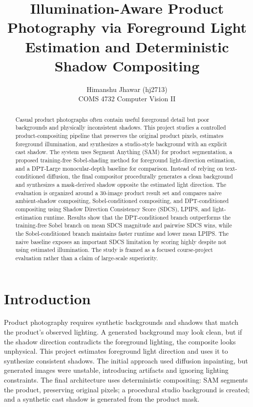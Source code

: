 \documentclass{article}
\title{Illumination-Aware Product Photography via Foreground Light Estimation and Deterministic Shadow Compositing}
\author{
Himanshu Jhawar (hj2713)\\
COMS 4732 Computer Vision II\\
}
\date{}
\begin{document}
\maketitle
\vspace{-1.5cm}  %

\begin{abstract}
Casual product photographs often contain useful foreground detail but poor backgrounds and physically inconsistent shadows. This project studies a controlled product-compositing pipeline that preserves the original product pixels, estimates foreground illumination, and synthesizes a studio-style background with an explicit cast shadow. The system uses Segment Anything (SAM) for product segmentation, a proposed training-free Sobel-shading method for foreground light-direction estimation, and a DPT-Large monocular-depth baseline for comparison. Instead of relying on text-conditioned diffusion, the final compositor procedurally generates a clean background and synthesizes a mask-derived shadow opposite the estimated light direction. The evaluation is organized around a 30-image product result set and compares naive ambient-shadow compositing, Sobel-conditioned compositing, and DPT-conditioned compositing using Shadow Direction Consistency Score (SDCS), LPIPS, and light-estimation runtime. Results show that the DPT-conditioned branch outperforms the training-free Sobel branch on mean SDCS magnitude and pairwise SDCS wins, while the Sobel-conditioned branch maintains faster runtime and lower mean LPIPS. The naive baseline exposes an important SDCS limitation by scoring highly despite not using estimated illumination. The study is framed as a focused course-project evaluation rather than a claim of large-scale superiority.
\end{abstract}

\section{Introduction}
Product photography requires synthetic backgrounds and shadows that match the product's observed lighting. A generated background may look clean, but if the shadow direction contradicts the foreground lighting, the composite looks unphysical. This project estimates foreground light direction and uses it to synthesize consistent shadows. The initial approach used diffusion inpainting, but generated images were unstable, introducing artifacts and ignoring lighting constraints. The final architecture uses deterministic compositing: SAM \citep{kirillov2023sam} segments the product, preserving original pixels; a procedural studio background is created; and a synthetic cast shadow is generated from the product mask.
\end{document}

